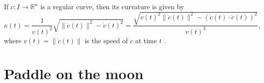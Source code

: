 \begin{lemma}{}
    If \(c : I \rightarrow  {\mathbb{R}}^{n}\) is a regular curve, then its curvature is given by
    \[
    \kappa \left( t\right)  = \frac{1}{v{\left( t\right) }^{2}}\sqrt{\parallel \ddot{c}\left( t\right) {\parallel }^{2} - \dot{v}{\left( t\right) }^{2}} = \frac{\sqrt{v{\left( t\right) }^{2}\parallel \ddot{c}\left( t\right) {\parallel }^{2} - {\left( \dot{c}\left( t\right)  \cdot  \ddot{c}\left( t\right) \right) }^{2}}}{v{\left( t\right) }^{3}}, \tag{1.4}
    \]
    where \(v\left( t\right)  = \parallel \dot{c}\left( t\right) \parallel\) is the speed of \(c\) at time \(t\) .
\end{lemma}


\section{Paddle on the moon}